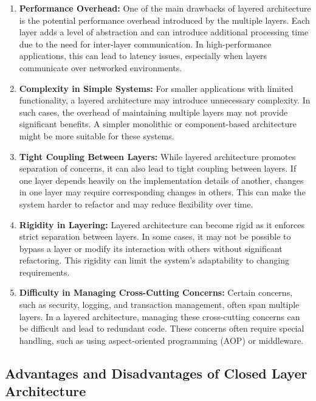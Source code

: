 \begin{enumerate}
	\item \textbf{Performance Overhead:} 
	One of the main drawbacks of layered architecture is the potential performance overhead introduced by the multiple layers. Each layer adds a level of abstraction and can introduce additional processing time due to the need for inter-layer communication. In high-performance applications, this can lead to latency issues, especially when layers communicate over networked environments.
	
	\item \textbf{Complexity in Simple Systems:} 
	For smaller applications with limited functionality, a layered architecture may introduce unnecessary complexity. In such cases, the overhead of maintaining multiple layers may not provide significant benefits. A simpler monolithic or component-based architecture might be more suitable for these systems.
	
	\item \textbf{Tight Coupling Between Layers:} 
	While layered architecture promotes separation of concerns, it can also lead to tight coupling between layers. If one layer depends heavily on the implementation details of another, changes in one layer may require corresponding changes in others. This can make the system harder to refactor and may reduce flexibility over time.
	
	\item \textbf{Rigidity in Layering:} 
	Layered architecture can become rigid as it enforces strict separation between layers. In some cases, it may not be possible to bypass a layer or modify its interaction with others without significant refactoring. This rigidity can limit the system's adaptability to changing requirements.
	
	\item \textbf{Difficulty in Managing Cross-Cutting Concerns:} 
	Certain concerns, such as security, logging, and transaction management, often span multiple layers. In a layered architecture, managing these cross-cutting concerns can be difficult and lead to redundant code. These concerns often require special handling, such as using aspect-oriented programming (AOP) or middleware.
\end{enumerate}

\subsection{Advantages and Disadvantages of Closed Layer Architecture}

